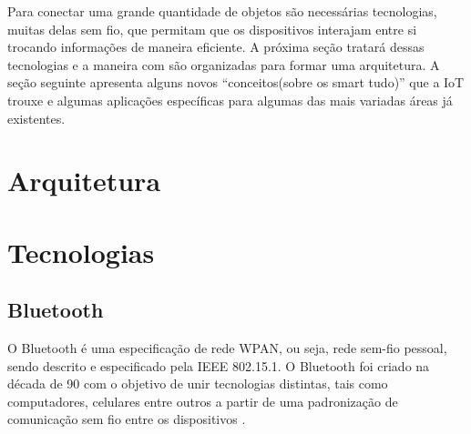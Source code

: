 Para conectar uma grande quantidade de objetos são necessárias tecnologias, muitas delas sem fio, que permitam que os dispositivos interajam entre si trocando informações de maneira eficiente. A próxima seção tratará dessas tecnologias e a maneira com são organizadas para formar uma arquitetura. A seção seguinte apresenta alguns novos ``conceitos(sobre os smart tudo)'' que a IoT trouxe e algumas aplicações específicas para algumas das mais variadas áreas já existentes.


\section{Arquitetura}


\section{Tecnologias}

\subsection{Bluetooth}

O Bluetooth é uma especificação de rede WPAN, ou seja, rede sem-fio pessoal, sendo descrito e especificado pela IEEE 802.15.1. O Bluetooth foi criado na década de 90 com o objetivo de unir tecnologias distintas, tais como computadores, celulares entre outros a partir de uma padronização de comunicação sem fio entre os dispositivos \cite{Kardach2008}. 



